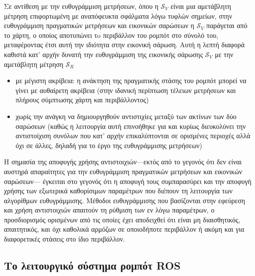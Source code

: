 \begin{gg_box}
\begin{remark}
Σε αντίθεση με την ευθυγράμμιση μετρήσεων, όπου η $\mathcal{S}_V$ είναι μια
αμετάβλητη μέτρηση επιφορτωμένη με αναπόφευκτα σφάλματα λόγω τυφλών σημείων,
στην ευθυγράμμιση πραγματικών μετρήσεων και εικονικών σαρώσεων η
$\mathcal{S}_V$ παράγεται από το χάρτη, ο οποίος αποτυπώνει τo περιβάλλον του
ρομπότ στο σύνολό του, μεταφέροντας έτσι αυτή την ιδιότητα στην εικονική
σάρωση. Αυτή η λεπτή διαφορά καθιστά κατ' αρχήν δυνατή την ευθυγράμμιση της
εικονικής σάρωσης $\mathcal{S}_V$ με την αμετάβλητη μέτρηση $\mathcal{S}_R$
\begin{itemize}
  \item με μέγιστη ακρίβεια: η ανάκτηση της πραγματικής στάσης του ρομπότ
        μπορεί να γίνει με αυθαίρετη ακρίβεια (στην ιδανική περίπτωση τέλειων
        μετρήσεων και πλήρους σύμπτωσης χάρτη και περιβάλλοντος)
  \item χωρίς την ανάγκη να δημιουργηθούν αντιστιχίες μεταξύ των ακτίνων των
        δύο σαρώσεων (καθώς η λειτουργία αυτή επινοήθηκε για και κυρίως
        διευκολύνει την αντιστοίχιση συνόλων που κατ' αρχήν επικαλύπτονται σε
        ορισμένες περιοχές αλλά όχι σε άλλες, δηλαδή για το έργο της
        ευθυγράμμισης μετρήσεων)
\end{itemize}
\end{remark}
\end{gg_box}

\begin{gg_box}
\begin{remark}
Η σημασία της αποφυγής χρήσης αντιστοιχιών---εκτός από το γεγονός ότι δεν είναι
αυστηρά απαραίτητες για την ευθυγράμμιση πραγματικών μετρήσεων και εικονικών
σαρώσεων--- έγκειται στο γεγονός ότι η αποφυγή τους συμπαρασύρει και την
αποφυγή χρήσης των εξωτερικά καθορίσιμων παραμέτρων που διέπουν τη λειτουργία των
αλγορίθμων ευθυγράμμισης. Μέθοδοι ευθυγράμμισης που βασίζονται στην εφεύρεση
και χρήση αντιστοιχιών απαιτούν τη ρύθμιση των εν λόγω παραμέτρων, ο
προσδιορισμός ορισμένων από τις οποίες έχει αποδειχθεί ότι είναι μη
διαισθητικός, απαιτητικός, και όχι καθολικά αρμόζων σε οποιοδήποτε
περιβάλλον ή ακόμη και για διαφορετικές στάσεις στο ίδιο περιβάλλον.
\end{remark}
\end{gg_box}


\subsection{Το λειτουργικό σύστημα ρομπότ ROS}
\label{subsec:01_01_02_7}

